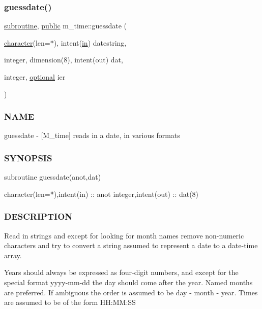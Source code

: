 \begin{DoxyVerb}
\subsubsection{\texorpdfstring{guessdate()}{guessdate()}}
{\footnotesize\ttfamily \hyperlink{M__stopwatch_83_8txt_acfbcff50169d691ff02d4a123ed70482}{subroutine}, \hyperlink{M__stopwatch_83_8txt_a2f74811300c361e53b430611a7d1769f}{public} m\+\_\+time\+::guessdate (\begin{DoxyParamCaption}\item[{\hyperlink{option__stopwatch_83_8txt_abd4b21fbbd175834027b5224bfe97e66}{character}(len=$\ast$), intent(\hyperlink{M__journal_83_8txt_afce72651d1eed785a2132bee863b2f38}{in})}]{datestring,  }\item[{integer, dimension(8), intent(out)}]{dat,  }\item[{integer, \hyperlink{option__stopwatch_83_8txt_aa4ece75e7acf58a4843f70fe18c3ade5}{optional}}]{ier }\end{DoxyParamCaption})}



\subsubsection*{N\+A\+ME}

guessdate -\/ \mbox{[}M\+\_\+time\mbox{]} reads in a date, in various formats 

\subsubsection*{S\+Y\+N\+O\+P\+S\+IS}

\begin{DoxyVerb}subroutine guessdate(anot,dat)

 character(len=*),intent(in) :: anot
 integer,intent(out)         :: dat(8)
\end{DoxyVerb}


\subsubsection*{D\+E\+S\+C\+R\+I\+P\+T\+I\+ON}

\begin{DoxyVerb}Read in strings and except for looking for month names remove
non-numeric characters and try to convert a string assumed to represent
a date to a date-time array.

Years should always be expressed as four-digit numbers, and except for
the special format yyyy-mm-dd the day should come after the year. Named
months are preferred. If ambiguous the order is assumed to be day -
month - year. Times are assumed to be of the form HH:MM:SS


\end{DoxyVerb}
\end{DoxyVerb}
